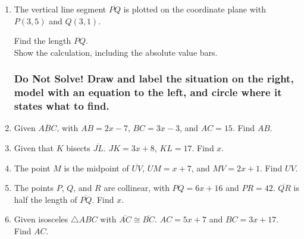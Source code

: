 \begin{enumerate}
\item The vertical line segment $\overline{PQ}$ is plotted on the coordinate plane with $P(3,5)$ and $Q(3,1)$. 
\begin{multicols}{2}
  Find the length $PQ$. \\[0.5cm]
  Show the calculation, including the absolute value bars.
    \begin{flushright}
    \end{flushright}
\end{multicols}
  
\newpage
\subsubsection*{Do Not Solve! Draw and label the situation on the right, model with an equation to the left, and circle where it states what to find.}
  \vspace{0.5cm}

\item Given $\overline{ABC}$, with $AB=2x-7$, $BC=3x-3$, and $AC=15$. Find ${AB}$.
\item Given that $K$ bisects $\overline{JL}$. $JK=3x+8$, $KL=17$. Find ${x}$.
\item The point $M$ is the midpoint of $\overline{UV}$, $UM=x+7$, and $MV=2x+1$. Find ${UV}$.
\item The points $P$, $Q$, and $R$ are collinear, with $PQ=6x+16$ and $PR=42$. $\overline{QR}$ is half the length of $\overline{PQ}$. Find ${x}$.

\newpage
\item Given isosceles $\triangle ABC$ with $\overline{AC} \cong \overline{BC}$. $AC=5x+7$ and $BC=3x+17$. \\ Find $AC$.\\[0.5cm]


\end{enumerate}
